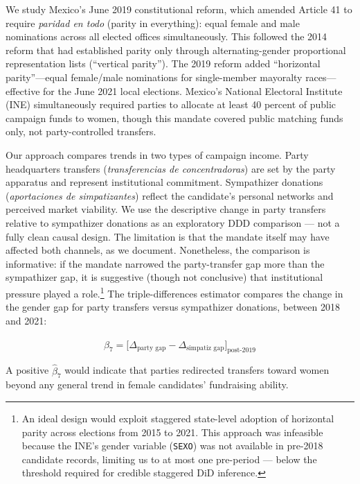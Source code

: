 \documentclass[12pt]{article}
\begin{document}
We study Mexico's June 2019 constitutional reform, which amended Article 41 to require \textit{paridad en todo} (parity in everything): equal female and male nominations across all elected offices simultaneously. This followed the 2014 reform that had established parity only through alternating-gender proportional representation lists (``vertical parity''). The 2019 reform added ``horizontal parity''---equal female/male nominations for single-member mayoralty races---effective for the June 2021 local elections. Mexico's National Electoral Institute (INE) simultaneously required parties to allocate at least 40 percent of public campaign funds to women, though this mandate covered public matching funds only, not party-controlled transfers.

Our approach compares trends in two types of campaign income. Party headquarters transfers (\textit{transferencias de concentradoras}) are set by the party apparatus and represent institutional commitment. Sympathizer donations (\textit{aportaciones de simpatizantes}) reflect the candidate's personal networks and perceived market viability. We use the descriptive change in party transfers relative to sympathizer donations as an exploratory DDD comparison --- not a fully clean causal design. The limitation is that the mandate itself may have affected both channels, as we document. Nonetheless, the comparison is informative: if the mandate narrowed the party-transfer gap more than the sympathizer gap, it is suggestive (though not conclusive) that institutional pressure played a role.\footnote{An ideal design would exploit staggered state-level adoption of horizontal parity across elections from 2015 to 2021. This approach was infeasible because the INE's gender variable (\texttt{SEXO}) was not available in pre-2018 candidate records, limiting us to at most one pre-period --- below the threshold required for credible staggered DiD inference.} The triple-differences estimator compares the change in the gender gap for party transfers versus sympathizer donations, between 2018 and 2021:

\begin{equation}
\hat{\beta}_7 = \bigl[\Delta_{\text{party gap}} - \Delta_{\text{simpatiz gap}}\bigr]_{\text{post-2019}}
\label{eq:ddd_intuition}
\end{equation}

A positive $\hat{\beta}_7$ would indicate that parties redirected transfers toward women beyond any general trend in female candidates' fundraising ability.
\end{document}
